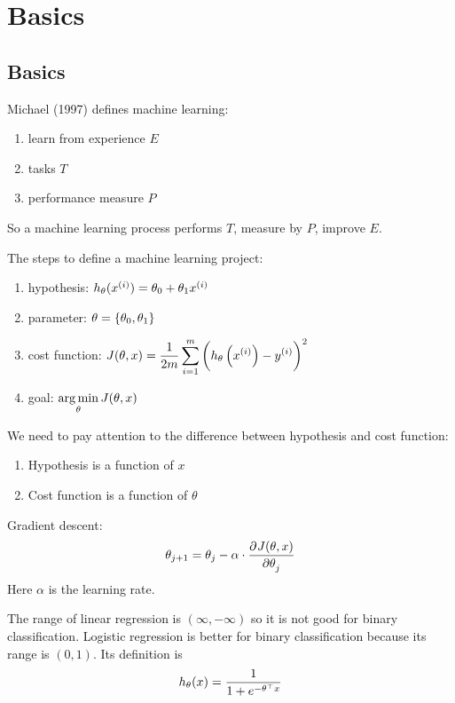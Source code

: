 \section{Basics}



\subsection{Basics}

Michael (1997) defines machine learning:
\begin{enumerate}
    \item learn from experience $E$
    \item tasks $T$
    \item performance measure $P$
\end{enumerate}

So a machine learning process performs $T$, measure by $P$, improve $E$.


The steps to define a machine learning project:
\begin{enumerate}
    \item hypothesis: $h_\theta ( {x}^{(i)} ) = \theta_0 + \theta_1 {x}^{(i)}$
    \item parameter: $\theta = \set{\theta_0, \theta_1}$
    \item cost function: $\displaystyle J(\theta, x) = \frac{1}{2m} \sum_{i=1}^m \left( h_\theta  \left({x}^{(i)}\right) - {y}^{(i)} \right)^2$
    \item goal: $\displaystyle \mathop{\arg\min}\limits_{\theta}  J(\theta,x)$
\end{enumerate}

We need to pay attention to the difference between hypothesis and cost function:
\begin{enumerate}
    \item Hypothesis is a function of $x$
    \item Cost function is a function of $\theta$
\end{enumerate}

Gradient descent:
\begin{equation}
    \theta_{j+1} = \theta_j - \alpha  \cdot \dpd{J(\theta, x)}{\theta_j}
\end{equation}
Here $\alpha$ is the learning rate.


The range of linear regression is $(\infty, -\infty)$ so it is not good for binary classification. Logistic regression is better for binary classification because its range is $(0, 1)$. Its definition is 
\begin{equation}
    h_\theta(x) = \frac{1}{1 + e^{- {\theta}^\top x}}
\end{equation}

